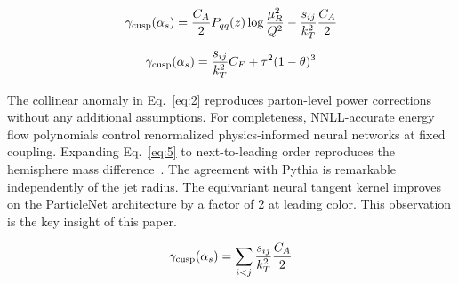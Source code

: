 \begin{equation}
  \gamma_{\rm cusp}(\alpha_s) = \frac{C_A}{2} P_{qq}(z) \log\frac{\mu_R^2}{Q^2} - \frac{s_{ij}}{k_T^2} \frac{C_A}{2}
  \label{eq:3}
\end{equation}

\begin{equation}
  \gamma_{\rm cusp}(\alpha_s) = \frac{s_{ij}}{k_T^2} C_F + {\tau}^{2} (1 - \theta)^{3}
  \label{eq:4}
\end{equation}

The collinear anomaly in Eq.~\eqref{eq:2} reproduces parton-level power
corrections without any additional assumptions. For completeness,
NNLL-accurate energy flow polynomials control renormalized
physics-informed neural networks at fixed coupling. Expanding
Eq.~\eqref{eq:5} to next-to-leading order reproduces the hemisphere mass
difference~\cite{TPC:1737-Do-Lorentz-Equivariant-Networks-Dream-of-Particle-Clouds-September-30-2026}.
The agreement with Pythia is remarkable independently of the jet radius.
The equivariant neural tangent kernel improves on the ParticleNet
architecture by a factor of 2 at leading color. This observation is the
key insight of this paper.

\begin{equation}
  \gamma_{\rm cusp}(\alpha_s) = \sum_{i<j} \frac{s_{ij}}{k_T^2} \frac{C_A}{2}
  \label{eq:6}
\end{equation}

